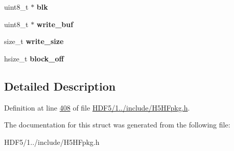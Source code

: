 \begin{DoxyCompactItemize}
uint8\+\_\+t $\ast$ {\bfseries blk}
\item 
\mbox{\label{struct_h5_h_f__direct__t_a40a8063073b690257cbacd6f110817e2}} 
uint8\+\_\+t $\ast$ {\bfseries write\+\_\+buf}
\item 
\mbox{\label{struct_h5_h_f__direct__t_a5c714bb169dcc24ca153561c38587847}} 
size\+\_\+t {\bfseries write\+\_\+size}
\item 
\mbox{\label{struct_h5_h_f__direct__t_ab9fb0114c9ee9da49224c765d9a86461}} 
hsize\+\_\+t {\bfseries block\+\_\+off}
\end{DoxyCompactItemize}


\subsection{Detailed Description}


Definition at line \hyperlink{_h_d_f5_21_810_81_2include_2_h5_h_fpkg_8h_source_l00408}{408} of file \hyperlink{_h_d_f5_21_810_81_2include_2_h5_h_fpkg_8h_source}{H\+D\+F5/1../include/\+H5\+H\+Fpkg.\+h}.



The documentation for this struct was generated from the following file\+:\begin{DoxyCompactItemize}
\item 
H\+D\+F5/1../include/\+H5\+H\+Fpkg.\+h\end{DoxyCompactItemize}
